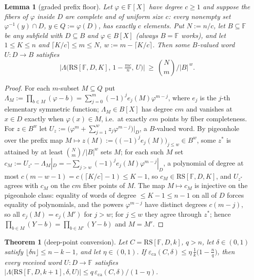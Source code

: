 \documentclass[11pt]{amsart}
\newtheorem{theorem}{Theorem}[section]
\newtheorem{lemma}[lemma]{Lemma}
\theoremstyle{definition}
\theoremstyle{remark}
\newcommand{\F}{\mathbb{F}}
\newcommand{\RS}{\mathrm{RS}}
\newcommand{\eca}{\varepsilon_{\mathrm{ca}}}
\newcommand{\Lst}{\Lambda}
\begin{document}
\begin{lemma}[graded prefix floor]\label{lem:floor}
Let $\varphi\in\F[X]$ have degree $c\ge1$ and suppose the fibers of $\varphi$ inside $D$ are complete and of uniform size $c$: every nonempty set $\varphi^{-1}(y)\cap D$, $y\in Q:=\varphi(D)$, has exactly $c$ elements. Put $N:=n/c$, let $B\subseteq\F$ be any subfield with $D\subseteq B$ and $\varphi\in B[X]$ (always $B=\F$ works), and let $1\le K\le n$ and $\lceil K/c\rceil\le m\le N$, $w:=m-\lceil K/c\rceil$. Then some $B$-valued word $U\colon D\to B$ satisfies
\[
\bigl|\Lst\bigl(\RS[\F,D,K],\,1-\tfrac{mc}n,\,U\bigr)\bigr|\ \ge\ \binom Nm\Big/|B|^{\,w}.
\]
\end{lemma}

\begin{proof}
For each $m$-subset $M\subseteq Q$ put $\Lambda_M:=\prod_{b\in M}(\varphi-b)=\sum_{j=0}^m(-1)^je_j(M)\varphi^{m-j}$, where $e_j$ is the $j$-th elementary symmetric function; $\Lambda_M\in B[X]$ has degree $cm$ and vanishes at $x\in D$ exactly when $\varphi(x)\in M$, i.e.\ at exactly $cm$ points by fiber completeness. For $z\in B^w$ let $U_z:=\bigl(\varphi^m+\sum_{j=1}^wz_j\varphi^{m-j}\bigr)\big|_D$, a $B$-valued word. By pigeonhole over the prefix map $M\mapsto z(M):=\bigl((-1)^je_j(M)\bigr)_{j\le w}\in B^w$, some $z^*$ is attained by at least $\binom Nm/|B|^w$ sets $M$; for each such $M$ set $c_M:=U_{z^*}-\Lambda_M|_D=-\sum_{j>w}(-1)^je_j(M)\varphi^{m-j}|_D$, a polynomial of degree at most $c(m-w-1)=c(\lceil K/c\rceil-1)\le K-1$, so $c_M\in\RS[\F,D,K]$, and $U_{z^*}$ agrees with $c_M$ on the $cm$ fiber points of $M$. The map $M\mapsto c_M$ is injective on the pigeonhole class: equality of words of degree $\le K-1\le n-1$ on all of $D$ forces equality of polynomials, and the powers $\varphi^{m-j}$ have distinct degrees $c(m-j)$, so all $e_j(M)=e_j(M')$ for $j>w$; for $j\le w$ they agree through $z^*$; hence $\prod_{b\in M}(Y-b)=\prod_{b\in M'}(Y-b)$ and $M=M'$.
\end{proof}

\begin{theorem}[deep-point conversion]\label{thm:conversion}
Let $C=\RS[\F,D,k]$, $q>n$, let $\delta\in(0,1)$ satisfy $\lfloor\delta n\rfloor\le n-k-1$, and let $\eta\in(0,1)$. If $\eca(C,\delta)\le\eta\,\frac1k\bigl(1-\frac nq\bigr)$, then every received word $U\colon D\to\F$ satisfies $\bigl|\Lst\bigl(\RS[\F,D,k+1],\delta,U\bigr)\bigr|\le q\,\eca(C,\delta)/(1-\eta)$.
\end{theorem}
\end{document}
